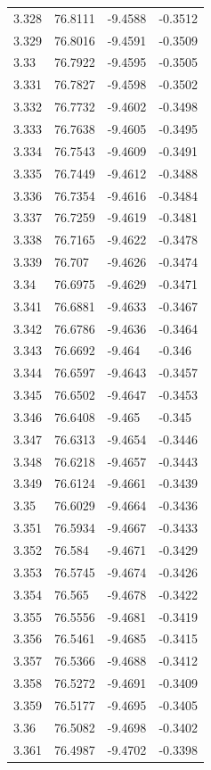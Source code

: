 \begin{tabular}{llll}
3.328 & 76.8111 & -9.4588 & -0.3512 \\
3.329 & 76.8016 & -9.4591 & -0.3509 \\
3.33 & 76.7922 & -9.4595 & -0.3505 \\
3.331 & 76.7827 & -9.4598 & -0.3502 \\
3.332 & 76.7732 & -9.4602 & -0.3498 \\
3.333 & 76.7638 & -9.4605 & -0.3495 \\
3.334 & 76.7543 & -9.4609 & -0.3491 \\
3.335 & 76.7449 & -9.4612 & -0.3488 \\
3.336 & 76.7354 & -9.4616 & -0.3484 \\
3.337 & 76.7259 & -9.4619 & -0.3481 \\
3.338 & 76.7165 & -9.4622 & -0.3478 \\
3.339 & 76.707 & -9.4626 & -0.3474 \\
3.34 & 76.6975 & -9.4629 & -0.3471 \\
3.341 & 76.6881 & -9.4633 & -0.3467 \\
3.342 & 76.6786 & -9.4636 & -0.3464 \\
3.343 & 76.6692 & -9.464 & -0.346 \\
3.344 & 76.6597 & -9.4643 & -0.3457 \\
3.345 & 76.6502 & -9.4647 & -0.3453 \\
3.346 & 76.6408 & -9.465 & -0.345 \\
3.347 & 76.6313 & -9.4654 & -0.3446 \\
3.348 & 76.6218 & -9.4657 & -0.3443 \\
3.349 & 76.6124 & -9.4661 & -0.3439 \\
3.35 & 76.6029 & -9.4664 & -0.3436 \\
3.351 & 76.5934 & -9.4667 & -0.3433 \\
3.352 & 76.584 & -9.4671 & -0.3429 \\
3.353 & 76.5745 & -9.4674 & -0.3426 \\
3.354 & 76.565 & -9.4678 & -0.3422 \\
3.355 & 76.5556 & -9.4681 & -0.3419 \\
3.356 & 76.5461 & -9.4685 & -0.3415 \\
3.357 & 76.5366 & -9.4688 & -0.3412 \\
3.358 & 76.5272 & -9.4691 & -0.3409 \\
3.359 & 76.5177 & -9.4695 & -0.3405 \\
3.36 & 76.5082 & -9.4698 & -0.3402 \\
3.361 & 76.4987 & -9.4702 & -0.3398 \\

\end{tabular}
